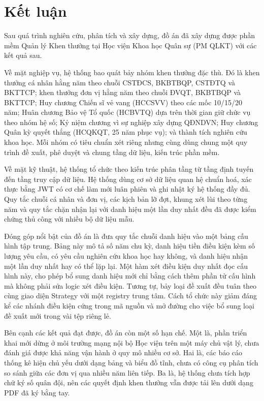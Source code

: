 \documentclass[../DoAn.tex]{subfiles}
\begin{document}
\section{Kết luận}
\label{section:6.1}

Sau quá trình nghiên cứu, phân tích và xây dựng, đồ án đã xây dựng được phần mềm Quản lý Khen thưởng tại Học viện Khoa học Quân sự (PM QLKT) với các kết quả sau.

Về mặt nghiệp vụ, hệ thống bao quát bảy nhóm khen thưởng đặc thù. Đó là khen thưởng cá nhân hằng năm theo chuỗi CSTĐCS, BKBTBQP, CSTĐTQ và BKTTCP; khen thưởng đơn vị hằng năm theo chuỗi ĐVQT, BKBTBQP và BKTTCP; Huy chương Chiến sĩ vẻ vang (HCCSVV) theo các mốc 10/15/20 năm; Huân chương Bảo vệ Tổ quốc (HCBVTQ) dựa trên thời gian giữ chức vụ theo nhóm hệ số; Kỷ niệm chương vì sự nghiệp xây dựng QĐNDVN; Huy chương Quân kỳ quyết thắng (HCQKQT, 25 năm phục vụ); và thành tích nghiên cứu khoa học. Mỗi nhóm có tiêu chuẩn xét riêng nhưng cùng dùng chung một quy trình đề xuất, phê duyệt và chung tầng dữ liệu, kiến trúc phần mềm.

Về mặt kỹ thuật, hệ thống tổ chức theo kiến trúc phân tầng từ tầng định tuyến đến tầng truy cập dữ liệu. Hệ thống dùng cơ sở dữ liệu quan hệ chuẩn hoá, xác thực bằng JWT có cơ chế làm mới luân phiên và ghi nhật ký hệ thống đầy đủ. Quy tắc chuỗi cá nhân và đơn vị, các kịch bản lỡ đợt, khung xét lùi theo từng năm và quy tắc chặn nhận lại với danh hiệu một lần duy nhất đều đã được kiểm chứng thủ công với nhiều bộ dữ liệu mẫu.

Đóng góp nổi bật của đồ án là đưa quy tắc chuỗi danh hiệu vào một bảng cấu hình tập trung. Bảng này mô tả số năm chu kỳ, danh hiệu tiền điều kiện kèm số lượng yêu cầu, có yêu cầu nghiên cứu khoa học hay không, và danh hiệu nhận một lần duy nhất hay có thể lặp lại. Một hàm xét điều kiện duy nhất đọc cấu hình này, cho phép bổ sung danh hiệu mới chỉ bằng cách thêm phần tử cấu hình mà không phải sửa logic xét điều kiện. Tương tự, bảy loại đề xuất đều tuân theo cùng giao diện Strategy với một registry trung tâm. Cách tổ chức này giảm đáng kể các nhánh điều kiện cứng trong mã nguồn và mở đường cho việc bổ sung loại đề xuất mới trong vài tệp riêng lẻ.

Bên cạnh các kết quả đạt được, đồ án còn một số hạn chế. Một là, phần triển khai mới dừng ở môi trường mạng nội bộ Học viện trên một máy chủ vật lý, chưa đánh giá được khả năng vận hành ở quy mô nhiều cơ sở. Hai là, các báo cáo thống kê hiện chủ yếu dưới dạng bảng và biểu đồ tĩnh, chưa có công cụ phân tích so sánh giữa các đơn vị qua nhiều năm liên tiếp. Ba là, hệ thống chưa tích hợp chữ ký số quân đội, nên các quyết định khen thưởng vẫn được tải lên dưới dạng PDF đã ký bằng tay.
\end{document}
